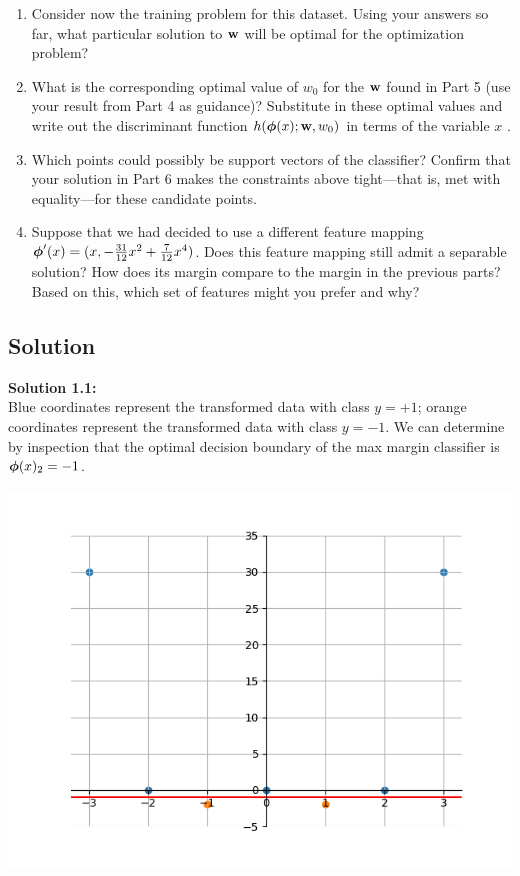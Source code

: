 \documentclass[submit]{harvardml}
\begin{document}
\begin{problem}
\begin{enumerate}
\item Consider now the training problem for this dataset. Using your
  answers so far, what particular solution to $\mathbf{w}$ will be optimal
  for the optimization problem?

\item What is the corresponding optimal value of $w_0$ for the
  $\mathbf{w}$ found in Part 5 (use your result from Part 4 as guidance)?
  Substitute in these optimal values and write out the discriminant
  function $h(\boldsymbol{\phi}(x);\mathbf{w},w_0)$ in terms of the variable $x$ .


\item Which points could possibly be support vectors of the classifier?  Confirm that
  your solution in Part 6 makes the constraints above tight---that is,
  met with equality---for these candidate points.

\item Suppose that we had decided to use a different feature mapping
    $\boldsymbol{\phi}'(x) = (x, -\frac{31}{12}x^2 + \frac{7}{12}x^4 )$.  Does
    this feature mapping still admit a separable solution?  How does
    its margin compare to the margin in the previous parts?  Based on
    this, which set of features might you prefer and why? 
    
\end{enumerate}

\end{problem}

\subsection*{Solution}
\noindent\textbf{Solution 1.1:}\\
Blue coordinates represent the transformed data with class $y = +1$; orange coordinates represent the transformed data with class $y = -1$. We can determine by inspection that the optimal decision boundary of the max margin classifier is $\boldsymbol{\phi}(x)_2 = -1$.
\begin{center}
    \includegraphics[scale=0.6]{1.1.png}
\end{center}
\end{document}
